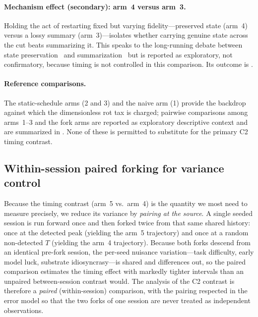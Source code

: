 \paragraph{Mechanism effect (secondary): arm~4 versus arm~3.}
Holding the act of restarting fixed but varying fidelity---preserved state
(arm~4) versus a lossy summary (arm~3)---isolates whether carrying genuine
state across the cut beats summarizing it. This speaks to the long-running
debate between state preservation~\cite{packer2023memgpt} and
summarization~\cite{wang2023recursive} but is reported as exploratory, not
confirmatory, because timing is not controlled in this comparison. Its outcome
is .

\paragraph{Reference comparisons.}
The static-schedule arms (2 and 3) and the naive arm (1) provide the backdrop
against which the dimensionless rot tax is charged; pairwise comparisons among
arms~1--3 and the fork arms are reported as exploratory descriptive context and
are summarized in . None of
these is permitted to substitute for the primary C2 timing contrast.

\subsection{Within-session paired forking for variance control}
\label{sec:intervention:paired}

Because the timing contrast (arm~5 vs.\ arm~4) is the quantity we most need to
measure precisely, we reduce its variance by \emph{pairing at the source}. A
single seeded session is run forward once and then forked twice from that same
shared history: once at the detected peak (yielding the arm~5 trajectory) and
once at a random non-detected $T$ (yielding the arm~4 trajectory). Because both
forks descend from an identical pre-fork session, the per-seed nuisance
variation---task difficulty, early model luck, substrate idiosyncrasy---is
shared and differences out, so the paired comparison estimates the timing
effect with markedly tighter intervals than an unpaired between-session
contrast would. The analysis of the C2 contrast is therefore a
\emph{paired} (within-session) comparison, with the pairing respected in the
error model so that the two forks of one session are never treated as
independent observations.

